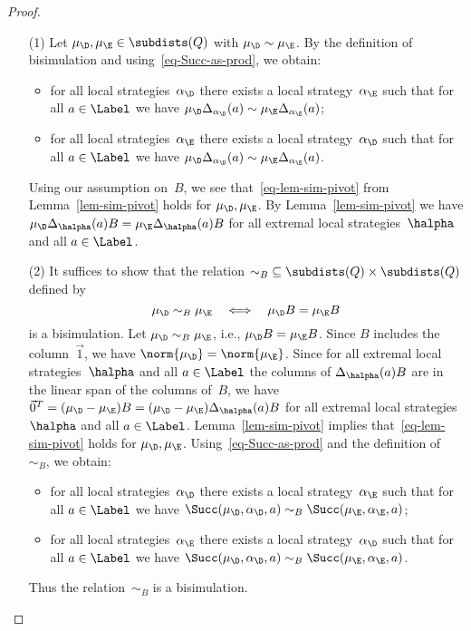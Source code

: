 \begin{proof}\leavevmode
\begin{itemize}[align=left]
\item[(1)]
Let $\mu_\D, \mu_\E \in \subdists(Q)$ with $\mu_\D \sim \mu_\E$.
By the definition of bisimulation and using~\eqref{eq-Succ-as-prod}, we obtain:
\begin{itemize}
\item for all local strategies~$\alpha_\D$ there exists a local strategy~$\alpha_\E$ such that for all $a \in \Label$ we have $\mu_\D \Delta_{\alpha_\D}(a) \sim \mu_\E \Delta_{\alpha_\E}(a)$;
\item for all local strategies~$\alpha_\E$ there exists a local strategy~$\alpha_\D$ such that for all $a \in \Label$ we have $\mu_\D \Delta_{\alpha_\D}(a) \sim \mu_\E \Delta_{\alpha_\E}(a)$.
\end{itemize}
Using our assumption on~$B$, we see that~\eqref{eq-lem-sim-pivot} from Lemma~\ref{lem-sim-pivot} holds for $\mu_\D, \mu_\E$.
By Lemma~\ref{lem-sim-pivot} we have $\mu_\D \Delta_{\halpha}(a) B = \mu_\E \Delta_{\halpha}(a) B$ for all extremal local strategies~$\halpha$ and all $a \in \Label$.
\item[(2)]
It suffices to show that the relation $\mathord{\sim_B} \subseteq \subdists(Q) \times \subdists(Q)$ defined by
\[
 \mu_\D \sim_B \mu_\E \quad \Longleftrightarrow \quad \mu_\D B = \mu_\E B
\]
is a bisimulation.
Let $\mu_\D \sim_B \mu_\E$, i.e., $\mu_\D B = \mu_\E B$.
Since $B$ includes the column~$\vec{1}$, we have $\norm{\mu_\D} = \norm{\mu_\E}$.
Since for all extremal local strategies~$\halpha$ and all $a \in \Label$ the columns of $\Delta_{\halpha}(a) B$ are in the linear span of the columns of~$B$, we have $\vec{0}^T = (\mu_\D - \mu_\E) B = (\mu_\D - \mu_\E) \Delta_{\halpha}(a) B$ for all extremal local strategies~$\halpha$ and all $a \in \Label$.
Lemma~\ref{lem-sim-pivot} implies that~\eqref{eq-lem-sim-pivot} holds for $\mu_\D, \mu_\E$.
Using~\eqref{eq-Succ-as-prod} and the definition of~$\mathord{\sim_B}$, we obtain:
\begin{itemize}
\item for all local strategies~$\alpha_\D$ there exists a local strategy~$\alpha_\E$ such that for all $a \in \Label$ we have $\Succ(\mu_\D, \alpha_\D, a) \sim_B \Succ(\mu_\E, \alpha_\E, a)$;
\item for all local strategies~$\alpha_\E$ there exists a local strategy~$\alpha_\D$ such that for all $a \in \Label$ we have $\Succ(\mu_\D, \alpha_\D, a) \sim_B \Succ(\mu_\E, \alpha_\E, a)$.
\end{itemize}
Thus the relation~$\mathord{\sim_B}$ is a bisimulation. \qedhere
\end{itemize}
\end{proof}

